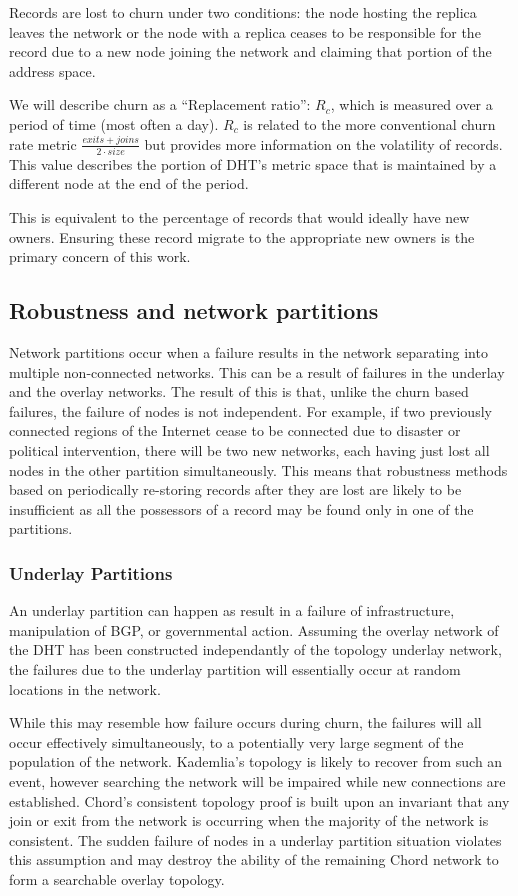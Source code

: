 Records are lost to churn under two conditions: the node hosting the replica leaves the network or the node with a replica ceases to be responsible for the record due to a new node joining the network and claiming that portion of the address space. 

We will describe churn as a ``Replacement ratio'': $R_{c}$, which is measured over a period of time (most often a day).
$R_{c}$ is related to the more conventional churn rate metric $\frac{exits + joins}{2 \cdot size}$ but provides more information on the volatility of records.
This value describes the portion of DHT's metric space that is maintained by a different node at the end of the period.

This is equivalent to the percentage of records that would ideally have new owners.
Ensuring these record migrate to the appropriate new owners is the primary concern of this work.  %


\subsection{Robustness and network partitions}
Network partitions occur when a failure results in the network separating into multiple non-connected networks.
This can be a result of failures in the underlay and the overlay networks.
The result of this is that, unlike the churn based failures,  the failure of nodes is not independent.
For example, if two previously connected regions of the Internet cease to be connected due to disaster or political intervention, there will be two new networks, each having just lost all nodes in the other partition simultaneously.
This means that robustness methods based on periodically re-storing records after they are lost are likely to be insufficient as all the possessors of a record may be found only in one of the partitions.

\subsubsection{Underlay Partitions}
An underlay partition can happen as result in a failure of infrastructure, manipulation of BGP, or governmental action.
Assuming the overlay network of the DHT has been constructed independantly of the topology underlay network, the failures due to the underlay partition will essentially occur at random locations in the network. 


While this may resemble how failure occurs during churn, the failures will all occur effectively simultaneously, to a potentially very large segment of the population of the network.
Kademlia's topology is likely to recover from such an event, however searching the network will be impaired while new connections are established.
Chord's consistent topology proof is built upon an invariant that any join or exit from the network is occurring when the majority of the network is consistent. 
The sudden failure of nodes in a underlay partition situation violates this assumption and may destroy the ability of the remaining Chord network to form a searchable overlay topology.

